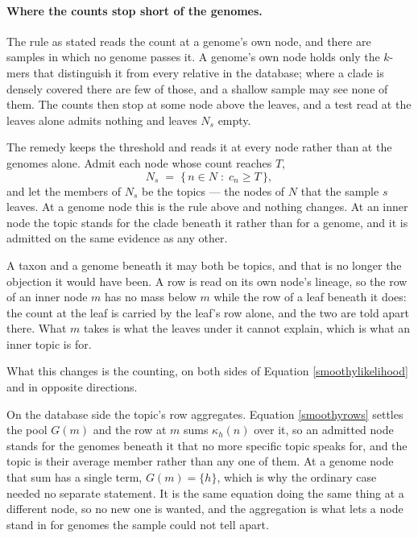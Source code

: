 \documentclass[pdflatex,sn-vancouver-num]{sn-jnl}
\begin{document}
    \paragraph{Where the counts stop short of the genomes.} The rule as stated reads the count at a
    genome's own node, and there are samples in which no genome passes it. A genome's own
    node holds only the $k$-mers that distinguish it from every relative in the database; where a
    clade is densely covered there are few of those, and a shallow sample may see none of them. The
    counts then stop at some node above the leaves, and a test read at the leaves alone admits
    nothing and leaves $N_s$ empty.

    The remedy keeps the threshold and reads it at every node rather than at the genomes alone.
    Admit each node whose count reaches $T$,
    \begin{equation}\label{smoothyadmit}
        N_s \;=\; \bigl\{\, n \in N \;:\; c_n \geq T \,\bigr\} ,
    \end{equation}
    and let the members of $N_s$ be the topics --- the nodes of $N$ that the sample $s$ leaves. At a genome node this is the rule above and nothing
    changes. At an inner node the topic stands for the clade beneath it rather than for a genome, and
    it is admitted on the same evidence as any other.

    A taxon and a genome beneath it may both be topics, and that is no longer the objection
    it would have been. A row is read on its own node's lineage, so the row of an inner node $m$ has
    no mass below $m$ while the row of a leaf beneath it does: the count at the leaf is carried by the
    leaf's row alone, and the two are told apart there. What $m$ takes is what the leaves under it
    cannot explain, which is what an inner topic is for.

    What this changes is the counting, on both sides of
    Equation \eqref{smoothylikelihood} and in opposite directions.

    On the database side the topic's row aggregates. Equation \eqref{smoothyrows} settles the pool
    $G(m)$ and the row at $m$ sums $\kappa_h(n)$ over it, so an admitted node stands for the
    genomes beneath it that no more specific topic speaks for, and the topic is their average member
    rather than any one of them. At a genome node that sum has a single term, $G(m) = \{h\}$,
    which is why the ordinary case needed no separate statement. It
    is the same equation doing the same thing at a different node, so no new one is wanted, and the
    aggregation is what lets a node stand in for genomes the sample could not tell apart.
\end{document}
